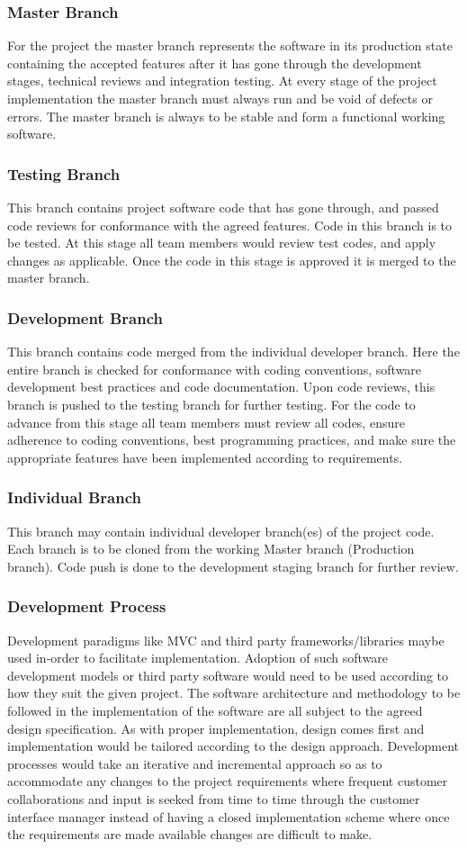\documentclass{article}
\begin{document}
\subsubsection{Master Branch}
For the project the master branch represents the software in its production state containing the accepted features after it has gone through the development stages, technical reviews and integration testing. At every stage of the project implementation the master branch must always run and be void of defects or errors. The master branch is always to be stable and form a functional working software.
\subsubsection{Testing Branch}
This branch contains project software code that has gone through, and passed code reviews for conformance with the agreed features. Code in this branch is to be tested. At this stage all team members would review test codes, and apply changes as applicable. Once the code in this stage is approved it is merged to the master branch.
\subsubsection{Development Branch}
This branch contains code merged from the individual developer branch. Here the entire branch is checked for conformance with coding conventions, software development best practices and code documentation. Upon code reviews, this branch is pushed to the testing branch for further testing. For the code to advance from this stage all team members must review all codes, ensure adherence to coding conventions, best programming practices, and make sure the appropriate features have been implemented according to requirements.
\subsubsection{Individual Branch}
This branch may contain individual developer branch(es) of the project code. Each branch is to be cloned from the working Master branch (Production branch). Code push is done to the development staging branch for further review.
\subsubsection{Development Process}
Development paradigms like MVC and third party frameworks/libraries maybe used in-order to facilitate implementation. Adoption of such software development models or third party software would need to be used according to how they suit the given project. The software architecture and methodology to be followed in the implementation of the software are all subject to the agreed design specification. As with proper implementation, design comes first and implementation would be tailored according to the design approach. Development processes would take an iterative and incremental approach so as to accommodate any changes to the project requirements where frequent customer collaborations and input is seeked from time to time through the customer interface manager instead of having a closed implementation scheme where once the requirements are made available changes are difficult to make.
\end{document}
